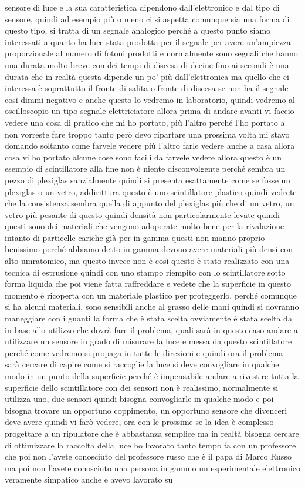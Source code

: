 sensore di luce e la sua caratteristica dipendono dall'elettronico e dal tipo di sensore, quindi ad esempio più o meno ci si aspetta comunque sia una forma di questo tipo, si tratta di un segnale analogico perché a questo punto siamo interessati a quanto ha luce stata prodotta per il segnale per avere un'ampiezza proporzionale al numero di fotoni prodotti e normalmente sono segnali che hanno una durata molto breve con dei tempi di discesa di decine fino ai secondi è una durata che in realtà questa dipende un po' più dall'elettronica ma quello che ci interessa è soprattutto il fronte di salita o fronte di discesa se non ha il segnale così dimmi negativo e anche questo lo vedremo in laboratorio, quindi vedremo al oscilloscopio un tipo segnale elettriciatore allora prima di andare avanti vi faccio vedere una cosa di pratico che mi ho portato, più l'altro perché l'ho portato a non vorreste fare troppo tanto però devo ripartare una prossima volta mi stavo domando soltanto come farvele vedere più l'altro farle vedere anche a casa allora cosa vi ho portato alcune cose sono facili da farvele vedere allora questo è un esempio di scintillatore alla fine non è niente disconvolgente perché sembra un pezzo di plexiglas sanzialmente quindi si presenta esattamente come se fosse un plexiglas o un vetro, addirittura questo è uno scintillatore plastico quindi vedrete che la consistenza sembra quella di appunto del plexiglas più che di un vetro, un vetro più pesante di questo quindi densità non particolarmente levate quindi questi sono dei materiali che vengono adoperate molto bene per la rivalazione intanto di particelle cariche già per in gamma questi non manno proprio benissimo perché abbiamo detto in gamma devono avere materiali più densi con alto umratomico, ma questo invece non è così questo è stato realizzato con una tecnica di estrusione quindi con uno stampo riempito con lo scintillatore sotto forma liquida che poi viene fatta raffreddare e vedete che la superficie in questo momento è ricoperta con un materiale plastico per proteggerlo, perché comunque si ha alcuni materiali, sono sensibili anche al grasso delle mani quindi si dovranno maneggiare con i guanti la forma che è stata scelta ovviamente è stata scelta da in base allo utilizzo che dovrà fare il problema, quali sarà in questo caso andare a utilizzare un sensore in grado di misurare la luce e messa da questo scintillatore perché come vedremo si propaga in tutte le direzioni e quindi ora il problema sarà cercare di capire come si raccoglie la luce si deve convogliare in qualche modo in un punto della superficie perché è impensabile andare a rivestire tutta la superficie dello scintillatore con dei sensori non è realissimo, normalmente si utilizza uno, due sensori quindi bisogna convogliarle in qualche modo e poi bisogna trovare un opportuno coppimento, un opportuno sensore che divenceri deve avere quindi vi farò vedere, ora con le prossime se la idea è complesso progettare a un ripulatore che è abbastanza semplice ma in realtà bisogna cercare di ottimizzare la raccolta della luce ho lavorato tanto tempo fa con un professore che poi non l'avete conosciuto del professore russo che è il papa di Marco Russo ma poi non l'avete conosciuto una persona in gammo un esperimentale elettronico veramente simpatico anche e avevo lavorato su 